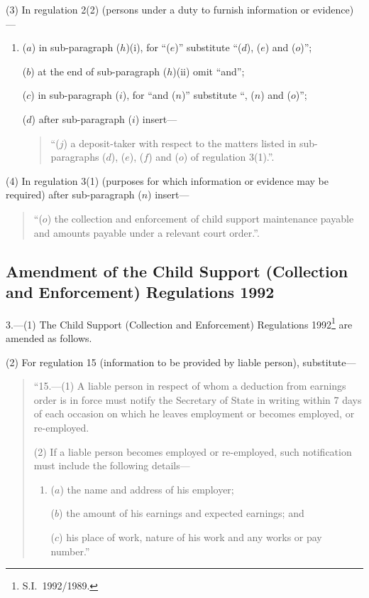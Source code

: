 \documentclass[12pt,a4paper]{article}
\begin{document}
(3) In regulation 2(2) (persons under a duty to furnish information or evidence)—
\begin{enumerate}\item[]
($a$) in sub-paragraph ($h$)(i), for “($e$)” substitute “($d$), ($e$)  and ($o$)”;

($b$) at the end of sub-paragraph ($h$)(ii) omit “and”;

($c$) in sub-paragraph ($i$), for “and ($n$)” substitute “, ($n$)  and ($o$)”;

($d$) after sub-paragraph ($i$) insert—
\begin{quotation}
“($j$) a deposit-taker with respect to the matters listed in sub-paragraphs ($d$), ($e$), ($f$)  and ($o$)  of regulation 3(1).”.
\end{quotation}
\end{enumerate}

(4) In regulation 3(1) (purposes for which information or evidence may be required) after sub-paragraph ($n$)  insert—
\begin{quotation}
“($o$) the collection and enforcement of child support maintenance payable and amounts payable under a relevant court order.”.
\end{quotation}

\subsection[3. Amendment of the Child Support (Collection and Enforcement) Regulations 1992]{Amendment of the Child Support (Collection and Enforcement) Regulations 1992}

3.---(1)  The Child Support (Collection and Enforcement) Regulations 1992\footnote{S.I.\ 1992/1989.} are amended as follows.

(2) For regulation 15 (information to be provided by liable person), substitute—
\begin{quotation}
“15.---(1)  A liable person in respect of whom a deduction from earnings order is in force must notify the Secretary of State in writing within 7 days of each occasion on which he leaves employment or becomes employed, or re-employed.

(2) If a liable person becomes employed or re-employed, such notification must include the following details—
\begin{enumerate}\item[]
($a$) the name and address of his employer;

($b$) the amount of his earnings and expected earnings; and

($c$) his place of work, nature of his work and any works or pay number.”
\end{enumerate}
\end{quotation}
\end{document}
